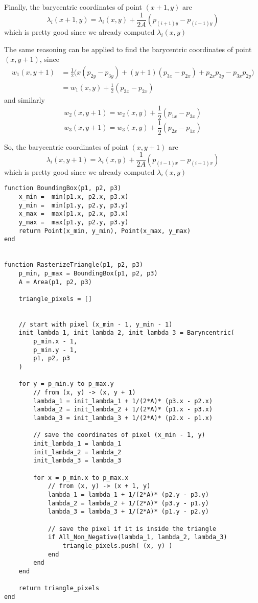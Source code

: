 \documentclass[a4paper, 11pt]{article}
\begin{document}
Finally, the barycentric coordinates of point $(x+1, y)$ are
$$ \lambda_i(x+1, y) = \lambda_i(x, y) + \frac{1}{2A}\left(p_{(i+1)y} - p_{(i-1)y}\right) $$
which is pretty good since we already computed $\lambda_i(x, y)$

The same reasoning can be applied to find the barycentric coordinates of point $(x, y+1)$,
since
\begin{align*}
	w_1(x, y+1) & =
	\frac{1}{2} \bigl(x(p_{2y} - p_{3y})  + (y+1) (p_{3x} - p_{2x}) +
	p_{2x}p_{3y} - p_{3x}p_{2y}\bigr)                         \\
	            & = w_1(x, y) + \frac{1}{2} (p_{3x} - p_{2x})
\end{align*}
and similarly
$$ w_2(x, y + 1) =  w_2(x, y) + \frac{1}{2} (p_{1x} - p_{3x})$$
$$ w_3(x, y + 1) = w_3(x, y) + \frac{1}{2} (p_{2x} - p_{1x})$$

So, the barycentric coordinates of point $(x, y+1)$ are
$$ \lambda_i(x, y+1) = \lambda_i(x, y) + \frac{1}{2A}\left(p_{(i-1)x} - p_{(i+1)x}\right) $$
which is pretty good since we already computed $\lambda_i(x, y)$

\begin{lstlisting}
function BoundingBox(p1, p2, p3)
    x_min =  min(p1.x, p2.x, p3.x)
    y_min =  min(p1.y, p2.y, p3.y)
    x_max =  max(p1.x, p2.x, p3.x)
    y_max =  max(p1.y, p2.y, p3.y)
    return Point(x_min, y_min), Point(x_max, y_max)
end


function RasterizeTriangle(p1, p2, p3)
    p_min, p_max = BoundingBox(p1, p2, p3)
    A = Area(p1, p2, p3)

    triangle_pixels = []
        

    // start with pixel (x_min - 1, y_min - 1)
    init_lambda_1, init_lambda_2, init_lambda_3 = Baryncentric(
        p_min.x - 1,
        p_min.y - 1,
        p1, p2, p3
    )

    for y = p_min.y to p_max.y
        // from (x, y) -> (x, y + 1)
        lambda_1 = init_lambda_1 + 1/(2*A)* (p3.x - p2.x)
        lambda_2 = init_lambda_2 + 1/(2*A)* (p1.x - p3.x)
        lambda_3 = init_lambda_3 + 1/(2*A)* (p2.x - p1.x)

        // save the coordinates of pixel (x_min - 1, y)
        init_lambda_1 = lambda_1
        init_lambda_2 = lambda_2
        init_lambda_3 = lambda_3

        for x = p_min.x to p_max.x
            // from (x, y) -> (x + 1, y)
            lambda_1 = lambda_1 + 1/(2*A)* (p2.y - p3.y)
            lambda_2 = lambda_2 + 1/(2*A)* (p3.y - p1.y)
            lambda_3 = lambda_3 + 1/(2*A)* (p1.y - p2.y)

            // save the pixel if it is inside the triangle
            if All_Non_Negative(lambda_1, lambda_2, lambda_3)
                triangle_pixels.push( (x, y) )
            end
        end
    end

    return triangle_pixels
end
\end{lstlisting}
\end{document}
